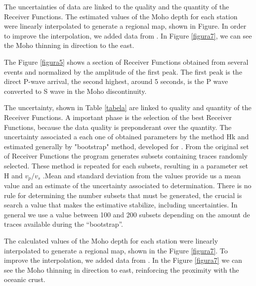 The uncertainties of data are linked to the quality and the quantity of the Receiver Functions. The estimated values of the Moho depth for each station were linearly interpolated to generate a regional map, shown in Figure. In order to improve the interpolation, we added data from \citep{assumpcao_crustal_2013}. In Figure \ref{figura7}, we can see the Moho thinning in direction to the east.

The Figure \ref{figura5} shows a section of Receiver Functions obtained from several events and normalized by the amplitude of the first peak. The first peak is the direct P-wave arrival, the second highest, around 5 seconds, is the P wave converted to S wave in the Moho discontinuity. 





The uncertainty, shown in Table \ref{tabela} are linked to quality and quantity of the Receiver Functions. A important phase is the selection of the best Receiver Functions, because the data quality is preponderant over the quantity. The uncertainty associated a each one of obtained parameters by the method Hk and estimated generally by "bootstrap" method, developed for  \citep{efron_statistical_1991}. From the original set of Receiver Functions the program generates subsets containing traces randomly selected. These method is repeated for each subsets, resulting in a parameter set H and $v_{p}/v_{s}$ .Mean and standard deviation from the values provide us a mean value and an estimate of the uncertainty associated to determination. There is no rule for determining the number subsets that must be generated, the crucial is search a value that makes the estimative stabilize,  including uncertainties. In general we use a value between 100 and 200 subsets depending on the amount de traces available during the “bootstrap”.

The calculated values of the Moho depth for each station were linearly interpolated to generate a regional map, shown in the Figure \ref{figura7}. To improve the interpolation, we added data from \citep{assumpcao_crustal_2013}. In the Figure \ref{figura7} we can see the Moho thinning in direction to east, reinforcing the proximity with the oceanic crust.

